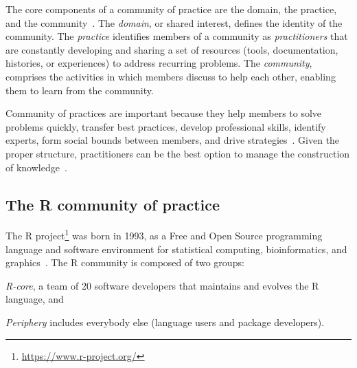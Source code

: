     The core components of a community of practice are the domain, the practice, and the community~\cite{Wenger2011}.
    The \textit{domain}, or shared interest, defines the identity of the community.
    The \textit{practice} identifies members of a community as \textit{practitioners} that are constantly developing and sharing a set of resources (tools, documentation, histories, or experiences) to address recurring problems. 
    The \textit{community}, comprises the activities in which members discuss to help each other, enabling them to learn from the community.

    Community of practices are important because they help members to solve problems quickly, transfer best practices, develop professional skills, identify experts, form social bounds between members, and drive strategies~\cite{Wenger2011, Storey2014}.
    Given the proper structure, practitioners can be the best option to manage the construction of knowledge~\cite{Wenger2011}.


\subsection{The R community of practice}

The R project\footnote{\url{https://www.r-project.org/}} was born in 1993, as a Free and Open Source programming language and software environment for statistical computing, bioinformatics, and graphics~\cite{Ihaka1996}.
The R community is composed of two groups:
\begin{enumerate*}[label=(\arabic*)]
  \item \textit{R-core}, a team of 20 software developers that maintains and evolves the R language, and
  \item \textit{Periphery} includes everybody else (language users and package developers).
\end{enumerate*}


